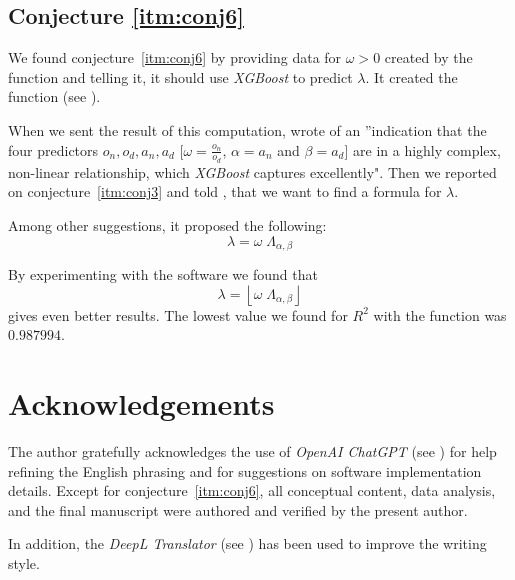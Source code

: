 \documentclass[11pt]{article}
\theoremstyle{remark}
\begin{document}
\subsection{Conjecture \ref{itm:conj6}}

We found conjecture~\ref{itm:conj6} by providing \chat data for $\omega > 0$ created by the \langc function  and telling it, it should use \emph{XGBoost} to predict $\lambda$. It created the \langp function  (see \cite{Kunert2025}). 

When we sent the result of this computation, \chat wrote of an ”indication that the four predictors \(o_n, o_d, a_n, a_d\) [$\omega = \frac{o_n}{o_d}$, $\alpha = a_n$ and $\beta = a_d$] are in a highly complex, non-linear relationship, which \emph{XGBoost} captures excellently". Then we reported on conjecture~\ref{itm:conj3} and told \chat, that we want to find a formula for $\lambda$.

Among other suggestions, it proposed the following:
%
\begin{equation}
\lambda = \omega \; \Lambda_{\alpha, \beta}
\end{equation}

By experimenting with the \langc software we found that
%
\begin{equation}
\lambda = \left\lfloor \omega \; \Lambda_{\alpha, \beta} \right\rfloor
\end{equation}
%
gives even better results. The lowest value we found for $R^2$ with the \langc function  was $0.987994$.

\section*{Acknowledgements}

The author gratefully acknowledges the use of \emph{OpenAI ChatGPT} (see \cite{ChatGPT}) for help refining the English phrasing and for suggestions on software implementation details. Except for conjecture~\ref{itm:conj6}, all conceptual content, data analysis, and the final manuscript were authored and verified by the present author.

In addition, the \emph{DeepL Translator} (see \cite{DeepL}) has been used to improve the writing style.
\end{document}
